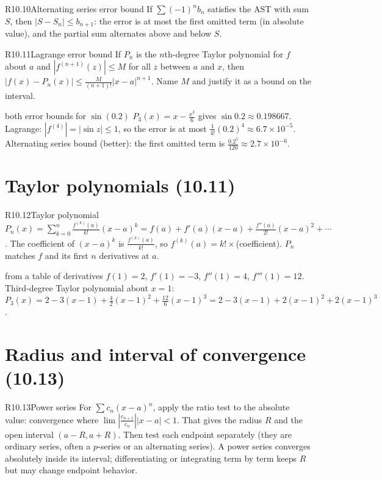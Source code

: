 \documentclass{apcalc}
\begin{document}
\begin{rulebox}{R10.10}{Alternating series error bound}
If $\sum(-1)^nb_n$ satisfies the AST with sum $S$, then $|S-S_n|\le b_{n+1}$: the error is at most the first omitted term (in absolute value), and the partial sum alternates above and below $S$.
\end{rulebox}

\begin{rulebox}{R10.11}{Lagrange error bound}
If $P_n$ is the $n$th-degree Taylor polynomial for $f$ about $a$ and $|f^{(n+1)}(z)|\le M$ for all $z$ between $a$ and $x$, then $\displaystyle|f(x)-P_n(x)|\le\frac{M}{(n+1)!}|x-a|^{n+1}$. Name $M$ and justify it as a bound on the interval.
\end{rulebox}

\begin{example}{both error bounds for $\sin(0.2)$}
$P_3(x)=x-\frac{x^3}{6}$ gives $\sin0.2\approx0.198667$. Lagrange: $|f^{(4)}|=|\sin z|\le1$, so the error is at most $\frac{1}{4!}(0.2)^4\approx6.7\times10^{-5}$. Alternating series bound (better): the first omitted term is $\frac{0.2^5}{120}\approx2.7\times10^{-6}$.
\end{example}

\section{Taylor polynomials (10.11)}

\begin{rulebox}{R10.12}{Taylor polynomial}
$P_n(x)=\displaystyle\sum_{k=0}^{n}\frac{f^{(k)}(a)}{k!}(x-a)^k=f(a)+f'(a)(x-a)+\frac{f''(a)}{2!}(x-a)^2+\cdots$. The coefficient of $(x-a)^k$ is $\frac{f^{(k)}(a)}{k!}$, so $f^{(k)}(a)=k!\times$(coefficient). $P_n$ matches $f$ and its first $n$ derivatives at $a$.
\end{rulebox}

\begin{example}{from a table of derivatives}
$f(1)=2$, $f'(1)=-3$, $f''(1)=4$, $f'''(1)=12$. Third-degree Taylor polynomial about $x=1$: $P_3(x)=2-3(x-1)+\frac42(x-1)^2+\frac{12}{6}(x-1)^3=2-3(x-1)+2(x-1)^2+2(x-1)^3$.
\end{example}

\section{Radius and interval of convergence (10.13)}

\begin{rulebox}{R10.13}{Power series}
For $\sum c_n(x-a)^n$, apply the ratio test to the absolute value: convergence where $\lim\left|\frac{c_{n+1}}{c_n}\right||x-a|<1$. That gives the radius $R$ and the open interval $(a-R,a+R)$. Then test each endpoint separately (they are ordinary series, often a $p$-series or an alternating series). A power series converges absolutely inside its interval; differentiating or integrating term by term keeps $R$ but may change endpoint behavior.
\end{rulebox}
\end{document}
